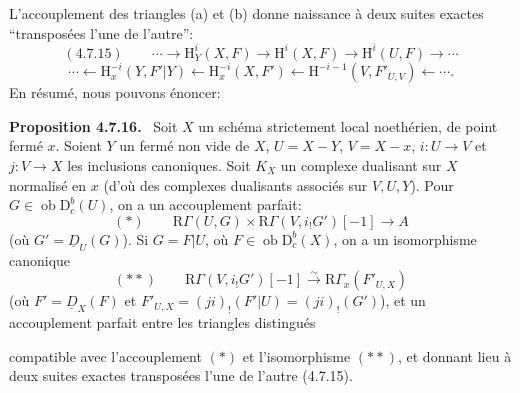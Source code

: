 \documentclass[11pt]{article}
\newenvironment{statement}[1]{\par\medskip\noindent\textbf{#1.}\ }{\par\medskip}
\renewcommand{\H}{\mathrm{H}}
\newcommand{\R}{\mathrm{R}}
\newcommand{\D}{\mathrm{D}}
\newcommand{\ob}{\operatorname{ob}}
\providecommand{\ob}{\operatorname{ob}}
\providecommand{\R}{\mathrm R}
\begin{document}
L'accouplement des triangles (a) et (b) donne naissance à deux suites exactes ``transposées l'une de l'autre'':
\[
(4.7.15)\qquad \cdots\longrightarrow \H_Y^i(X,F)\longrightarrow\H^i(X,F)\longrightarrow\H^i(U,F)\longrightarrow\cdots
\]
\[
\cdots\longleftarrow \H_x^{-i}(Y,F'|Y)\longleftarrow\H_x^{-i}(X,F')\longleftarrow\H^{-i-1}(V,F'_{U,V})\longleftarrow\cdots.
\]
En résumé, nous pouvons énoncer:

\begin{statement}{Proposition 4.7.16}
Soit $X$ un schéma strictement local noethérien, de point fermé $x$. Soient $Y$ un fermé non vide de $X$, $U=X-Y$, $V=X-x$, $i:U\to V$ et $j:V\to X$ les inclusions canoniques. Soit $K_X$ un complexe dualisant sur $X$ normalisé en $x$ (d'où des complexes dualisants associés sur $V,U,Y$). Pour $G\in\ob\D_c^b(U)$, on a un accouplement parfait:
\[
(*)\qquad \R\Gamma(U,G)\times\R\Gamma(V,i_!G')[-1]\longrightarrow A
\]
(où $G'=\underline{D}_U(G)$). Si $G=F|U$, où $F\in\ob\D_c^b(X)$, on a un isomorphisme canonique
\[
(**)\qquad \R\Gamma(V,i_!G')[-1]\xrightarrow{\sim}\R\Gamma_x(F'_{U,X})
\]
(où $F'=\underline{D}_X(F)$ et $F'_{U,X}=(ji)_!(F'|U)=(ji)_!(G')$), et un accouplement parfait entre les triangles distingués
\begin{center}
\end{center}
compatible avec l'accouplement $(*)$ et l'isomorphisme $(**)$, et donnant lieu à deux suites exactes transposées l'une de l'autre (4.7.15).
\end{statement}
\end{document}
